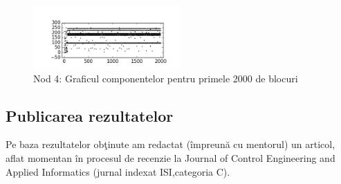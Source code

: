 \documentclass{llncs}
\begin{document}
\begin{figure}
\begin{center}
\includegraphics[width=0.5\textwidth]{img/carouri_db4.png}    %
\caption{Nod 4: Graficul componentelor pentru primele 2000 de blocuri} 
\label{fig:carouri_db4}
\end{center}
\end{figure}

\subsection{Publicarea rezultatelor}

Pe baza rezultatelor ob\c{t}inute am redactat (\^{i}mpreun\u{a} cu mentorul) un articol, aflat momentan \^{i}n procesul de recenzie la Journal of Control Engineering and Applied Informatics (jurnal indexat ISI,categoria C). \cite{Ceai:2015}
%
%
%
\clearpage


\end{document}
